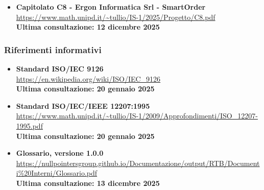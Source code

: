 	\begin{itemize}[itemsep=5pt, parsep=5pt, label=$\scriptstyle\bullet$]

    \item \textbf{Capitolato C8 - Ergon Informatica Srl - SmartOrder}\\
    \url{https://www.math.unipd.it/~tullio/IS-1/2025/Progetto/C8.pdf}\\[3pt]
    \textbf{Ultima consultazione: 12 dicembre 2025}

	\end{itemize}

	\subsubsection{Riferimenti informativi}
	\begin{itemize}[itemsep=5pt, parsep=5pt, label=$\scriptstyle\bullet$]

    \item \textbf{Standard ISO/IEC 9126}\\
     \url{https://en.wikipedia.org/wiki/ISO/IEC\_9126}\\[3pt]
    \textbf{Ultima consultazione: 20 gennaio 2025}

    \item \textbf{Standard ISO/IEC/IEEE 12207:1995}\\
     \url{https://www.math.unipd.it/~tullio/IS-1/2009/Approfondimenti/ISO_12207-1995.pdf}\\[3pt]
    \textbf{Ultima consultazione: 20 gennaio 2025}

	\item \textbf{Glossario, versione 1.0.0}\\
     \url{https://nullpointersgroup.github.io/Documentazione/output/RTB/Documenti%20Interni/Glossario.pdf}\\[3pt]
    \textbf{Ultima consultazione: 13 dicembre 2025}

	\end{itemize}
